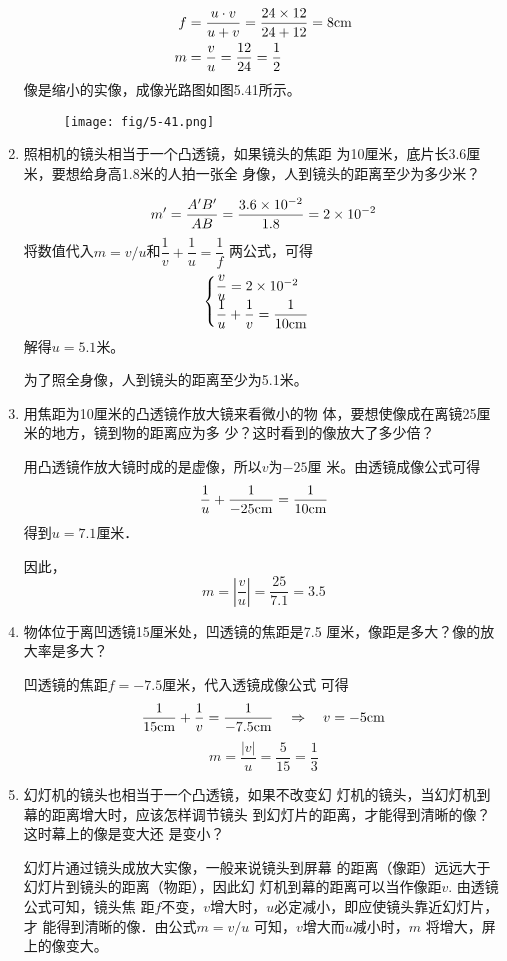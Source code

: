 \begin{enumerate}
\begin{solution}
\[\begin{split}
    f&=\frac{u\cdot v}{u+v}=\frac{24\times 12}{24+12}=8{\rm cm}\\
    m&=\frac{v}{u}=\frac{12}{24}=\frac{1}{2}
\end{split}\]
像是缩小的实像，成像光路图如图5.41所示。
\begin{figure}[htp]
    \centering
    \texttt{[image: fig/5-41.png]}
    \caption{}
\end{figure}
\end{solution}
\item 照相机的镜头相当于一个凸透镜，如果镜头的焦距
为10厘米，底片长3.6厘米，要想给身高1.8米的人拍一张全
身像，人到镜头的距离至少为多少米？

\begin{solution}
\[m'=\frac{A'B'}{AB}=\frac{3.6\times 10^{-2}}{1.8}=2\times 10^{-2}\]
将数值代入$m=v/u$和$\dfrac{1}{v}+\dfrac{1}{u}=\dfrac{1}{f}$
两公式，可得
\[\begin{cases}
    \dfrac{v}{u}=2\times 10^{-2}\\
    \dfrac{1}{u}+\dfrac{1}{v}=\dfrac{1}{10{\rm cm}}
\end{cases}\]
解得$u=5.1$米。

为了照全身像，人到镜头的距离至少为5.1米。
\end{solution}
\item 用焦距为10厘米的凸透镜作放大镜来看微小的物
体，要想使像成在离镜25厘米的地方，镜到物的距离应为多
少？这时看到的像放大了多少倍？

\begin{solution}
用凸透镜作放大镜时成的是虚像，所以$v$为$-25$厘
米。由透镜成像公式可得
\[\frac{1}{u}+\frac{1}{-25{\rm cm}}=\frac{1}{10{\rm cm}}\]
得到$u=7.1$厘米．

因此，
\[m=\left|\frac{v}{u}\right|=\frac{25}{7.1}=3.5\]
\end{solution}
\item 物体位于离凹透镜15厘米处，凹透镜的焦距是7.5
厘米，像距是多大？像的放大率是多大？

\begin{solution}
    凹透镜的焦距$f=-7.5$厘米，代入透镜成像公式
    可得
\[\frac{1}{15{\rm cm}}+\frac{1}{v}=\frac{1}{-7.5{\rm cm}}\quad \Rightarrow\quad v=-5{\rm cm}\]
\[m=\frac{|v|}{u}=\frac{5}{15}=\frac{1}{3}\]
\end{solution}
\item 幻灯机的镜头也相当于一个凸透镜，如果不改变幻
灯机的镜头，当幻灯机到幕的距离增大时，应该怎样调节镜头
到幻灯片的距离，才能得到清晰的像？这时幕上的像是变大还
是变小？

\begin{solution}
    幻灯片通过镜头成放大实像，一般来说镜头到屏幕
    的距离（像距）远远大于幻灯片到镜头的距离（物距），因此幻
    灯机到幕的距离可以当作像距$v$. 由透镜公式可知，镜头焦
    距$f$不变，$v$增大时，$u$必定减小，即应使镜头靠近幻灯片，才
    能得到清晰的像．由公式$m=v/u$
    可知，$v$增大而$u$减小时，$m$
    将增大，屏上的像变大。
\end{solution}
\end{enumerate}





